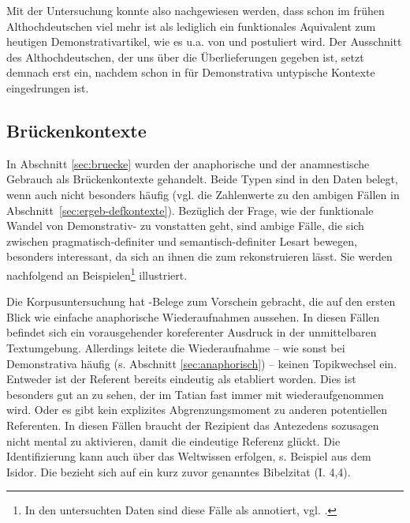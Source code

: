 Mit der Untersuchung konnte also nachgewiesen werden, dass  schon im frühen Althochdeutschen viel mehr ist als lediglich ein funktionales Aquivalent zum heutigen Demonstrativartikel, wie es u.a. von \textcite{Philippi1997} und \textcite{Demske2001} postuliert wird. Der Ausschnitt des Althochdeutschen, der uns über die Überlieferungen gegeben ist, setzt demnach erst ein, nachdem  schon in für Demonstrativa  untypische Kontexte eingedrungen ist. 


\subsection{Brückenkontexte}\label{sec:disk-bruecken}

In Abschnitt \ref{sec:bruecke} wurden der anaphorische  und der anamnestische  Gebrauch als Brückenkontexte  gehandelt. Beide Typen sind in den Daten belegt, wenn auch nicht besonders häufig (vgl. die Zahlenwerte zu den ambigen Fällen in Abschnitt~\ref{sec:ergeb-defkontexte}). Bezüglich der Frage, wie der funktionale Wandel von Demonstrativ-  zu  vonstatten geht, sind ambige Fälle, die sich zwischen prag\-ma\-tisch-de\-fi\-ni\-ter  und semantisch-definiter  Lesart bewegen, besonders interessant, da sich an ihnen die  zum  rekonstruieren lässt. Sie werden nachfolgend an Beispielen\footnote{In den untersuchten Daten sind diese Fälle als  annotiert, vgl. \textcite{HZKYL4_2020}.} illustriert. 

 

Die Korpusuntersuchung  hat -Belege zum Vorschein gebracht, die auf den ersten Blick wie einfache anaphorische  Wiederaufnahmen aussehen. In diesen Fällen befindet sich ein vorausgehender koreferenter Ausdruck in der unmittelbaren Textumgebung. Allerdings leitete die Wiederaufnahme -- wie sonst bei Demonstrativa  häufig (s. Abschnitt \ref{sec:anaphorisch}) -- keinen Topikwechsel ein. Entweder ist der Referent bereits eindeutig als  etabliert worden. Dies ist besonders gut an  zu sehen, der im Tatian fast immer mit  wiederaufgenommen wird. Oder es gibt kein explizites Abgrenzungsmoment zu anderen potentiellen Referenten.
In diesen Fällen braucht der Rezipient das Antezedens sozusagen nicht mental zu aktivieren, damit die eindeutige Referenz  glückt. Die Identifizierung kann auch über das Weltwissen erfolgen, s. Beispiel  aus dem Isidor. Die     bezieht sich auf ein kurz zuvor genanntes Bibelzitat  (I. 4,4).

